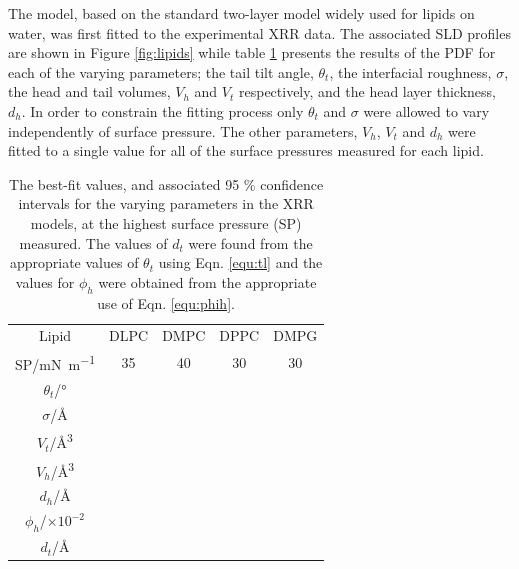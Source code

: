 \documentclass[twocolumn,a4paper]{paper}
\begin{document}
The model, based on the standard two-layer model widely used for lipids on water, was first fitted to the experimental XRR data.
The associated SLD profiles are shown in Figure \ref{fig:lipids} while table \ref{tab:liptab} presents the results of the PDF for each of the varying parameters; the tail tilt angle, $\theta_t$, the interfacial roughness, $\sigma$, the head and tail volumes, $V_h$ and $V_t$ respectively, and the head layer thickness, $d_h$.
In order to constrain the fitting process only $\theta_t$ and $\sigma$ were allowed to vary independently of surface pressure. The other parameters, $V_h$, $V_t$ and $d_h$ were fitted to a single value for all of the surface pressures measured for each lipid.

%
\begin{table}
  \centering
	\caption{\label{tab:liptab} The best-fit values, and associated 95 \% confidence intervals for the varying parameters in the XRR models, at the highest surface pressure (SP) measured. The values of $d_t$ were found from the appropriate values of $\theta_t$ using Eqn. \ref{equ:tl} and the values for $\phi_h$ were obtained from the appropriate use of Eqn. \ref{equ:phih}.}
	\begin{tabular}{ccccc}
		Lipid & DLPC & DMPC & DPPC & DMPG \\
    SP/\si{\milli\newton\per\meter} & 35 & 40 & 30 & 30 \\
		\hline
		$\theta_t$/\si{\degree} &  &  &  &  \\
		$\sigma$/\si{\angstrom} &  &  &  &  \\
    \hline
    $V_t$/\si{\cubic\angstrom} &  &  &  &  \\
		$V_h$/\si{\cubic\angstrom} &  &  &  &  \\
		$d_h$/\si{\angstrom} &  &  &  &  \\
    \hline
    $\phi_h$/$\times10^{-2}$ &  &  &  &  \\
		$d_t$/\si{\angstrom} &  &  &  &  \\
	\end{tabular}
\end{table}
%
\end{document}
